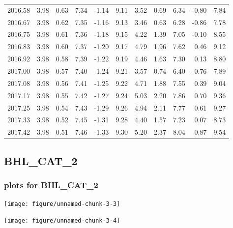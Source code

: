 \documentclass[10pt,a4paper]{article}\usepackage[]{graphicx}\usepackage[]{color}
\makeatletter
\def\maxwidth{ %
  \ifdim\Gin@nat@width>\linewidth
    \linewidth
  \else
    \Gin@nat@width
  \fi
}
\newcommand{\AaA}{\_}
\makeatother
\begin{document}
\begin{table}[ht]
\begin{tabular}{rrrrrrrrrrr}
  2016.58 & 3.98 & 0.63 & 7.34 & -1.14 & 9.11 & 3.52 & 0.69 & 6.34 & -0.80 & 7.84 \\ 
  2016.67 & 3.98 & 0.62 & 7.35 & -1.16 & 9.13 & 3.46 & 0.63 & 6.28 & -0.86 & 7.78 \\ 
  2016.75 & 3.98 & 0.61 & 7.36 & -1.18 & 9.15 & 4.22 & 1.39 & 7.05 & -0.10 & 8.55 \\ 
  2016.83 & 3.98 & 0.60 & 7.37 & -1.20 & 9.17 & 4.79 & 1.96 & 7.62 & 0.46 & 9.12 \\ 
  2016.92 & 3.98 & 0.58 & 7.39 & -1.22 & 9.19 & 4.46 & 1.63 & 7.30 & 0.13 & 8.80 \\ 
  2017.00 & 3.98 & 0.57 & 7.40 & -1.24 & 9.21 & 3.57 & 0.74 & 6.40 & -0.76 & 7.89 \\ 
  2017.08 & 3.98 & 0.56 & 7.41 & -1.25 & 9.22 & 4.71 & 1.88 & 7.55 & 0.39 & 9.04 \\ 
  2017.17 & 3.98 & 0.55 & 7.42 & -1.27 & 9.24 & 5.03 & 2.20 & 7.86 & 0.70 & 9.36 \\ 
  2017.25 & 3.98 & 0.54 & 7.43 & -1.29 & 9.26 & 4.94 & 2.11 & 7.77 & 0.61 & 9.27 \\ 
  2017.33 & 3.98 & 0.52 & 7.45 & -1.31 & 9.28 & 4.40 & 1.57 & 7.23 & 0.07 & 8.73 \\ 
  2017.42 & 3.98 & 0.51 & 7.46 & -1.33 & 9.30 & 5.20 & 2.37 & 8.04 & 0.87 & 9.54 \\ 
   \hline
\end{tabular}
\end{table}

\newpage
\subsection{BHL\AaA CAT\AaA 2}
\subsubsection{plots for BHL\AaA CAT\AaA 2}

\texttt{[image: figure/unnamed-chunk-3-3]} 

\newpage

\texttt{[image: figure/unnamed-chunk-3-4]} 

\newpage
\end{document}
